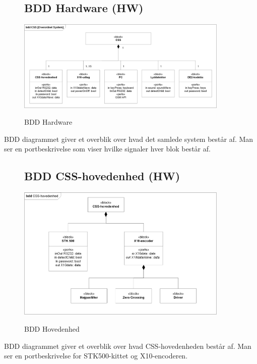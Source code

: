 \begin{figure}[H] \centering
\subsection{BDD Hardware (HW)}
{\includegraphics[width=0.9\textwidth]{billeder/diagrammer/BDD_Hardware}}
\caption{BDD Hardware}
\label{lab:bddhardware}
\raggedright
\end{figure}
BDD diagrammet giver et overblik over hvad det samlede system består af. Man ser en portbeskrivelse som viser hvilke signaler hver blok består af.

\begin{figure}[H] \centering
\subsection{BDD CSS-hovedenhed (HW)}
{\includegraphics[width=0.9\textwidth]{billeder/diagrammer/BDD_Hovedenhed}}
\caption{BDD Hovedenhed}
\label{lab:bddhovedenhed}
\raggedright
\end{figure}
BDD diagrammet giver et overblik over hvad CSS-hovedenheden består af. Man ser en portbeskrivelse for STK500-kittet og X10-encoderen. 

